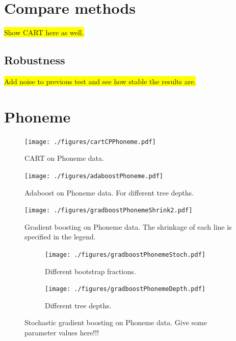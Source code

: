 \section{Compare methods}
\label{sec:Compare methods}
\colorbox{yellow}{Show CART here as well.}

\subsection{Robustness}
\label{sub:Robustness}

\colorbox{yellow}{Add noise to previous test and see how stable the results are.}
\section{Phoneme}
\label{sec:Phoneme}
\begin{figure}[h!]
\begin{center}
    \texttt{[image: ./figures/cartCPPhoneme.pdf]}
\end{center}
\caption{CART on Phoneme data.}
\label{fig:cartCPPhoneme}
\end{figure}


\begin{figure}[h!]
\begin{center}
    \texttt{[image: ./figures/adaboostPhoneme.pdf]}
\end{center}
\caption{Adaboost on Phoneme data. For different tree depths.}
\label{fig:adaboostPhoneme}
\end{figure}

\begin{figure}[h!]
\begin{center}
    \texttt{[image: ./figures/gradboostPhonemeShrink2.pdf]}
\end{center}
\caption{Gradient boosting on Phoneme data. The shrinkage of each line is specified in the legend.}
\label{fig:gradboostPhonemeShrink2}
\end{figure}

\begin{figure}[h!]
  \centering
  \begin{subfigure}[b]{0.48\textwidth}
    \texttt{[image: ./figures/gradboostPhonemeStoch.pdf]}
    \caption{Different bootstrap fractions.}
    \label{fig:gradboostPhonemeStoch}
  \end{subfigure}%
  \quad
  \begin{subfigure}[b]{0.48\textwidth}
    \texttt{[image: ./figures/gradboostPhonemeDepth.pdf]}
    \caption{Different tree depths.}
    \label{fig:gradboostPhonemeDepth}
  \end{subfigure}
  \vspace{1\baselineskip}
  \caption{Stochastic gradient boosting on Phoneme data. Give some parameter values here!!!}
  \label{fig:StochasticGradBoostPhoneme}
\end{figure}

